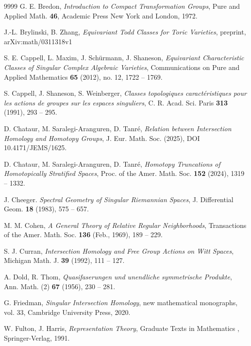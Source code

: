 \documentclass{amsart}
\theoremstyle{definition}
\theoremstyle{remark}
\begin{document}
\begin{thebibliography}{9999}
 G. E. Bredon,
 {\em Introduction to Compact Transformation Groups},
 Pure and Applied Math. \textbf{46}, Academic Press New York and London, 1972.
   
 J.-L. Brylinski, B. Zhang,
 {\em Equivariant Todd Classes for Toric Varieties},
 preprint, arXiv:math/0311318v1   
      
 S. E. Cappell, L. Maxim, J. Schürmann, J. Shaneson,
 {\em Equivariant Characteristic Classes of Singular Complex Algebraic Varieties},
 Communications on Pure and Applied Mathematics \textbf{65} (2012), no. 12, 1722 -- 1769.
         
  S. Cappell, J. Shaneson, S. Weinberger,
  {\em Classes topologiques caract\'eristiques pour les actions
  de groupes sur les espaces singuliers},
  C. R. Acad. Sci. Paris \textbf{313} (1991), 293 -- 295.  
        
 D. Chataur, M. Saralegi-Aranguren, D. Tanr\'e,
 {\em Relation between Intersection Homology and Homotopy Groups},
 J. Eur. Math. Soc. (2025), DOI 10.4171/JEMS/1625.   

 D. Chataur, M. Saralegi-Aranguren, D. Tanr\'e,
 {\em Homotopy Truncations of Homotopically Stratified Spaces},
 Proc. of the Amer. Math. Soc. \textbf{152} (2024), 1319 -- 1332.   
   
 J. Cheeger.
 {\em Spectral Geometry of Singular Riemannian Spaces},
 J. Differential Geom. \textbf{18} (1983), 575 -- 657.
             
 M. M. Cohen,
 {\em A General Theory of Relative Regular Neighborhoods},
 Transactions of the Amer. Math. Soc. \textbf{136} (Feb., 1969), 189 -- 229.                    
                    
 S. J. Curran,
 {\em Intersection Homology and Free Group Actions on Witt Spaces},
 Michigan Math. J. \textbf{39} (1992), 111 -- 127.
    
  A. Dold, R. Thom,
  {\em Quasifaserungen und unendliche symmetrische Produkte},
  Ann. Math. (2) \textbf{67} (1956), 230 -- 281.
  
 G. Friedman,
 {\em Singular Intersection Homology},
 new mathematical monographs, vol. 33,
 Cambridge University Press, 2020. 

 W. Fulton, J. Harris,
 {\em Representation Theory},
 Graduate Texts in Mathematics , Springer-Verlag, 1991.   
   

\end{thebibliography}
\end{document}
